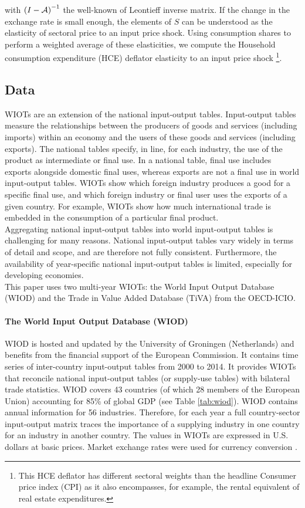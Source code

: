 \documentclass[12pt,a4paper]{paper}
\begin{document}
with ${\left( I-{\cal A} \right)}^{-1}$ the well-known of Leontieff inverse matrix. 
If the change in the exchange rate is small enough, the elements of $S$ can be understood as the elasticity of sectoral price to an input price shock. 
Using consumption shares to perform a weighted average of these elasticities, we compute the Household consumption expenditure (HCE) deflator elasticity to an input price shock \footnote{This HCE deflator has different sectoral weights than the headline Consumer price index (CPI) as it also encompasses, for example, the rental equivalent of real estate expenditures.}.


\subsection{Data}
\label{subsec:data}

WIOTs are an extension of the national input-output tables. 
Input-output tables measure the relationships between the producers of goods and services (including imports) within an economy and the users of these goods and services (including exports). The national tables specify, in line, for each industry, the use of the product as intermediate or final use. 
In a national table, final use includes exports alongside domestic final uses, whereas exports are not a final use in world input-output tables. 
WIOTs show which foreign industry produces a good for a specific final use, and which foreign industry or final user uses the exports of a given country. 
For example, WIOTs show how much international trade is embedded in the consumption of a particular final product. \\
Aggregating national input-output tables into world input-output tables is challenging for many reasons. National input-output tables vary widely in terms of detail and scope, and are therefore not fully consistent. Furthermore, the availability of year-specific national input-output tables is limited, especially for developing economies.  \\
This paper uses two multi-year WIOTs: the World Input Output Database (WIOD) and the Trade in Value Added Database (TiVA) from the OECD-ICIO.

\paragraph{The World Input Output Database (WIOD)}
WIOD is hosted and updated by the University of Groningen (Netherlands) and benefits from the financial support of the European Commission. 
It contains time series of inter-country input-output tables from 2000 to 2014. 
It provides WIOTs that reconcile national input-output tables (or supply-use tables) with bilateral trade statistics.
WIOD covers 43 countries (of which 28 members of the European Union) accounting for 85\% of global GDP (see Table \ref{tab:wiod}). 
WIOD contains annual information for 56 industries. Therefore, for each year a full country-sector input-output matrix traces the importance of a supplying industry in one country for an industry in another country. The values in WIOTs are expressed in U.S. dollars at basic prices. Market exchange rates were used for currency conversion \citep{Timmer2015}. 
\end{document}

